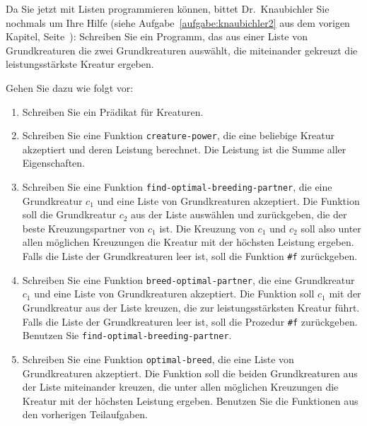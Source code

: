\begin{aufgabe}
  Da Sie jetzt mit Listen programmieren können, bittet Dr.~Knaubichler
  Sie nochmals um Ihre Hilfe (siehe Aufgabe~\ref{aufgabe:knaubichler2}
  aus dem vorigen Kapitel, Seite~\pageref{aufgabe:knaubichler2}):
  Schreiben Sie ein Programm, das aus einer Liste von Grundkreaturen
  die zwei Grundkreaturen auswählt, die miteinander gekreuzt die
  leistungsstärkste Kreatur ergeben.

  Gehen Sie dazu wie folgt vor:

  \begin{enumerate}
  \item Schreiben Sie ein Prädikat für Kreaturen.

  \item Schreiben Sie eine Funktion
    \texttt{creature-power}, die eine beliebige Kreatur akzeptiert und
    deren Leistung berechnet.  Die Leistung ist die Summe aller
    Eigenschaften.

  \item  Schreiben Sie eine Funktion
    \texttt{find-optimal-breeding-partner}, die eine Grundkreatur
    $c_1$ und eine Liste von Grundkreaturen akzeptiert.  Die Funktion
    soll die Grundkreatur $c_2$ aus der Liste auswählen und
    zurückgeben, die der beste Kreuzungspartner von $c_1$ ist.  Die
    Kreuzung von $c_1$ und $c_2$ soll also unter allen möglichen
    Kreuzungen die Kreatur mit der höchsten Leistung ergeben.  Falls
    die Liste der Grundkreaturen leer ist, soll die Funktion \verb|#f|
    zurückgeben.

  \item  Schreiben Sie eine Funktion
    \texttt{breed-optimal-partner}, die eine Grundkreatur $c_1$ und
    eine Liste von Grundkreaturen akzeptiert.  Die Funktion soll $c_1$
    mit der Grundkreatur aus der Liste kreuzen, die zur
    leistungsstärksten Kreatur führt.  Falls die Liste der
    Grundkreaturen leer ist, soll die Prozedur \verb|#f| zurückgeben.
    Benutzen Sie \texttt{find-optimal-breeding-partner}.

  \item  Schreiben Sie eine Funktion
    \texttt{optimal-breed}, die eine Liste von Grundkreaturen
    akzeptiert.  Die Funktion soll die beiden Grundkreaturen aus der
    Liste miteinander kreuzen, die unter allen möglichen Kreuzungen
    die Kreatur mit der höchsten Leistung ergeben.  Benutzen Sie die
    Funktionen aus den vorherigen Teilaufgaben.

  \end{enumerate}
\end{aufgabe}

